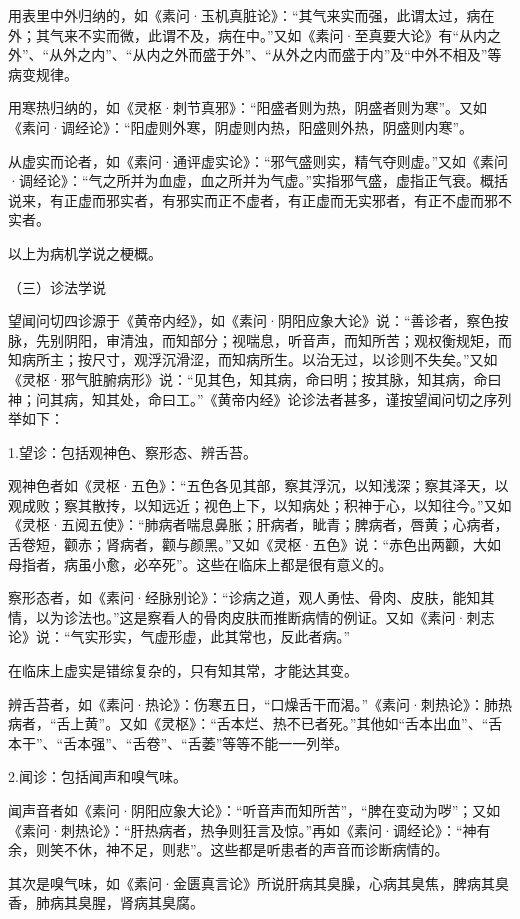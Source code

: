 \documentclass[12pt,UTF8]{ctexbook}
\begin{document}
用表里中外归纳的，如《素问·玉机真脏论》：“其气来实而强，此谓太过，病在外；其气来不实而微，此谓不及，病在中。”又如《素问·至真要大论》有“从内之外”、“从外之内”、“从内之外而盛于外”、“从外之内而盛于内”及“中外不相及”等病变规律。

用寒热归纳的，如《灵枢·刺节真邪》：“阳盛者则为热，阴盛者则为寒”。又如《素问·调经论》：“阳虚则外寒，阴虚则内热，阳盛则外热，阴盛则内寒”。

从虚实而论者，如《素问·通评虚实论》：“邪气盛则实，精气夺则虚。”又如《素问·调经论》：“气之所并为血虚，血之所并为气虚。”实指邪气盛，虚指正气衰。概括说来，有正虚而邪实者，有邪实而正不虚者，有正虚而无实邪者，有正不虚而邪不实者。

以上为病机学说之梗概。

（三）诊法学说

望闻问切四诊源于《黄帝内经》，如《素问·阴阳应象大论》说：“善诊者，察色按脉，先别阴阳，审清浊，而知部分；视喘息，听音声，而知所苦；观权衡规矩，而知病所主；按尺寸，观浮沉滑涩，而知病所生。以治无过，以诊则不失矣。”又如《灵枢·邪气脏腑病形》说：“见其色，知其病，命曰明；按其脉，知其病，命曰神；问其病，知其处，命曰工。”《黄帝内经》论诊法者甚多，谨按望闻问切之序列举如下：

1.望诊：包括观神色、察形态、辨舌苔。

观神色者如《灵枢·五色》：“五色各见其部，察其浮沉，以知浅深；察其泽天，以观成败；察其散抟，以知远近；视色上下，以知病处；积神于心，以知往今。”又如《灵枢·五阅五使》：“肺病者喘息鼻胀；肝病者，眦青；脾病者，唇黄；心病者，舌卷短，颧赤；肾病者，颧与颜黑。”又如《灵枢·五色》说：“赤色出两颧，大如母指者，病虽小愈，必卒死”。这些在临床上都是很有意义的。

察形态者，如《素问·经脉别论》：“诊病之道，观人勇怯、骨肉、皮肤，能知其情，以为诊法也。”这是察看人的骨肉皮肤而推断病情的例证。又如《素问·刺志论》说：“气实形实，气虚形虚，此其常也，反此者病。”

在临床上虚实是错综复杂的，只有知其常，才能达其变。

辨舌苔者，如《素问·热论》：伤寒五日，“口燥舌干而渴。”《素问·刺热论》：肺热病者，“舌上黄”。又如《灵枢》：“舌本烂、热不已者死。”其他如“舌本出血”、“舌本干”、“舌本强”、“舌卷”、“舌萎”等等不能一一列举。

2.闻诊：包括闻声和嗅气味。

闻声音者如《素问·阴阳应象大论》：“听音声而知所苦”，“脾在变动为哕”；又如《素问·刺热论》：“肝热病者，热争则狂言及惊。”再如《素问·调经论》：“神有余，则笑不休，神不足，则悲”。这些都是听患者的声音而诊断病情的。

其次是嗅气味，如《素问·金匮真言论》所说肝病其臭臊，心病其臭焦，脾病其臭香，肺病其臭腥，肾病其臭腐。
\end{document}
